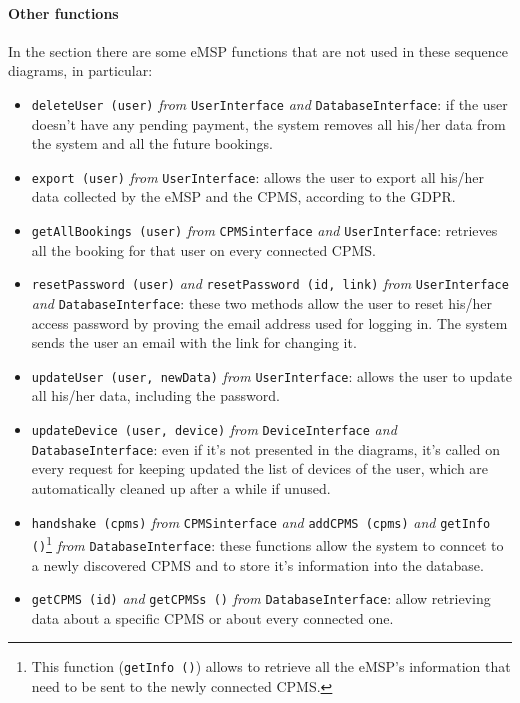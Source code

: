 \paragraph{Other functions} In the  section there are some eMSP functions that are not used in these sequence diagrams, in particular:
\begin{itemize}
    \item \texttt{deleteUser (user)} \textit{from} \texttt{UserInterface} \textit{and} \texttt{DatabaseInterface}: if the user doesn't have any pending payment, the system removes all his/her data from the system and all the future bookings.
    \item \texttt{export (user)} \textit{from} \texttt{UserInterface}: allows the user to export all his/her data collected by the eMSP and the CPMS, according to the GDPR.
    \item \texttt{getAllBookings (user)} \textit{from} \texttt{CPMSinterface} \textit{and} \texttt{UserInterface}: retrieves all the booking for that user on every connected CPMS.
    \item \texttt{resetPassword (user)} \textit{and} \texttt{resetPassword (id, link)} \textit{from} \texttt{UserInterface} \textit{and} \linebreak \texttt{DatabaseInterface}: these two methods allow the user to reset his/her access password by proving the email address used for logging in. The system sends the user an email with the link for changing it.
    \item \texttt{updateUser (user, newData)} \textit{from} \texttt{UserInterface}: allows the user to update all his/her data, including the password.
    \item \texttt{updateDevice (user, device)} \textit{from} \texttt{DeviceInterface} \textit{and} \texttt{DatabaseInterface}: even if it's not presented in the diagrams, it's called on every request for keeping updated the list of devices of the user, which are automatically cleaned up after a while if unused.
    \item \texttt{handshake (cpms)} \textit{from} \texttt{CPMSinterface} \textit{and} \texttt{addCPMS (cpms)} \textit{and} \texttt{getInfo ()}\footnote{This function (\texttt{getInfo ()}) allows to retrieve all the eMSP's information that need to be sent to the newly connected CPMS.} \textit{from} \linebreak \texttt{DatabaseInterface}: these functions allow the system to conncet to a newly discovered CPMS and to store it's information into the database.
    \item \texttt{getCPMS (id)} \textit{and} \texttt{getCPMSs ()} \textit{from} \texttt{DatabaseInterface}: allow retrieving data about a specific CPMS or about every connected one.
\end{itemize}

